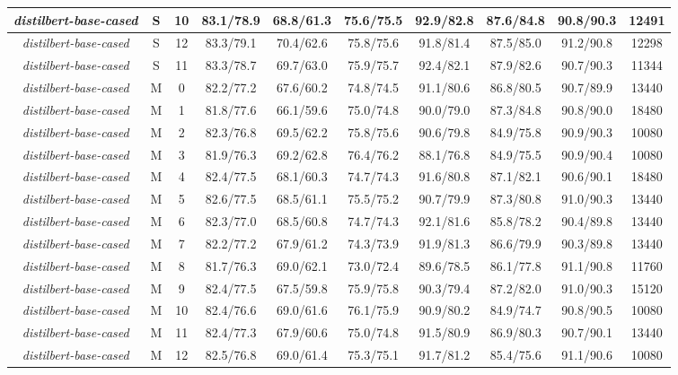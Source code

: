\begin{table*}
{\begin{tabular}{|c|c|c||c|c|c|c|c|c||c|}
\textit{distilbert-base-cased} & S & 10 & 83.1/78.9 & 68.8/61.3 & 75.6/75.5 & 92.9/82.8 & 87.6/84.8 & 90.8/90.3 & 12491 \\ \hline
\textit{distilbert-base-cased} & S & 12 & 83.3/79.1 & 70.4/62.6 & 75.8/75.6 & 91.8/81.4 & 87.5/85.0 & 91.2/90.8 & 12298 \\ \hline
\textit{distilbert-base-cased} & S & 11 & 83.3/78.7 & 69.7/63.0 & 75.9/75.7 & 92.4/82.1 & 87.9/82.6 & 90.7/90.3 & 11344 \\ \hline
\textit{distilbert-base-cased} & M & 0 & 82.2/77.2 & 67.6/60.2 & 74.8/74.5 & 91.1/80.6 & 86.8/80.5 & 90.7/89.9 & 13440 \\ \hline
\textit{distilbert-base-cased} & M & 1 & 81.8/77.6 & 66.1/59.6 & 75.0/74.8 & 90.0/79.0 & 87.3/84.8 & 90.8/90.0 & 18480 \\ \hline
\textit{distilbert-base-cased} & M & 2 & 82.3/76.8 & 69.5/62.2 & 75.8/75.6 & 90.6/79.8 & 84.9/75.8 & 90.9/90.3 & 10080 \\ \hline
\textit{distilbert-base-cased} & M & 3 & 81.9/76.3 & 69.2/62.8 & 76.4/76.2 & 88.1/76.8 & 84.9/75.5 & 90.9/90.4 & 10080 \\ \hline
\textit{distilbert-base-cased} & M & 4 & 82.4/77.5 & 68.1/60.3 & 74.7/74.3 & 91.6/80.8 & 87.1/82.1 & 90.6/90.1 & 18480 \\ \hline
\textit{distilbert-base-cased} & M & 5 & 82.6/77.5 & 68.5/61.1 & 75.5/75.2 & 90.7/79.9 & 87.3/80.8 & 91.0/90.3 & 13440 \\ \hline
\textit{distilbert-base-cased} & M & 6 & 82.3/77.0 & 68.5/60.8 & 74.7/74.3 & 92.1/81.6 & 85.8/78.2 & 90.4/89.8 & 13440 \\ \hline
\textit{distilbert-base-cased} & M & 7 & 82.2/77.2 & 67.9/61.2 & 74.3/73.9 & 91.9/81.3 & 86.6/79.9 & 90.3/89.8 & 13440 \\ \hline
\textit{distilbert-base-cased} & M & 8 & 81.7/76.3 & 69.0/62.1 & 73.0/72.4 & 89.6/78.5 & 86.1/77.8 & 91.1/90.8 & 11760 \\ \hline
\textit{distilbert-base-cased} & M & 9 & 82.4/77.5 & 67.5/59.8 & 75.9/75.8 & 90.3/79.4 & 87.2/82.0 & 91.0/90.3 & 15120 \\ \hline
\textit{distilbert-base-cased} & M & 10 & 82.4/76.6 & 69.0/61.6 & 76.1/75.9 & 90.9/80.2 & 84.9/74.7 & 90.8/90.5 & 10080 \\ \hline
\textit{distilbert-base-cased} & M & 11 & 82.4/77.3 & 67.9/60.6 & 75.0/74.8 & 91.5/80.9 & 86.9/80.3 & 90.7/90.1 & 13440 \\ \hline
\textit{distilbert-base-cased} & M & 12 & 82.5/76.8 & 69.0/61.4 & 75.3/75.1 & 91.7/81.2 & 85.4/75.6 & 91.1/90.6 & 10080 \\ \hline

\end{tabular}}
\end{table*}
